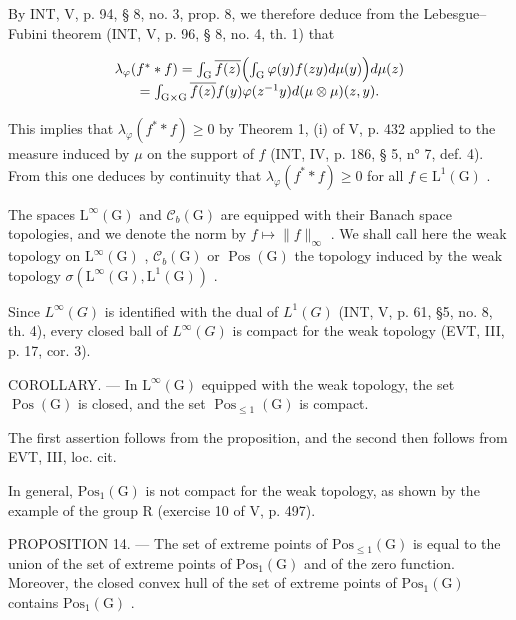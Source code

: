 By INT, V, p. 94, § 8, no. 3, prop. 8, we therefore deduce from the Lebesgue–Fubini theorem (INT, V, p. 96, § 8, no. 4, th. 1) that

\[
\begin{array}{c} \lambda_ {\varphi} (f ^ {*} * f) = \int_ {\mathrm{G}} \overline {{f (z)}} \Bigl (\int_ {\mathrm{G}} \varphi (y) f (z y) d \mu (y) \Bigr) d \mu (z) \\ = \int_ {\mathrm{G} \times \mathrm{G}} \overline {{f (z)}} f (y) \varphi (z ^ {- 1} y) d (\mu \otimes \mu) (z, y). \end{array}
\]

This implies that \(\lambda_{\varphi}(f^{*} * f) \geqslant 0\) by Theorem 1, (i) of V, p. 432 applied to the measure induced by \(\mu\) on the support of \(f\) (INT, IV, p. 186, § 5, n° 7, def. 4). From this one deduces by continuity that \(\lambda_{\varphi}(f^{*} * f) \geqslant 0\) for all \(f \in \mathrm{L}^1(\mathrm{G})\) .

The spaces \(\mathrm{L}^{\infty}(\mathrm{G})\) and \(\mathcal{C}_{b}(\mathrm{G})\) are equipped with their Banach space topologies, and we denote the norm by \(f \mapsto \|f\|_{\infty}\) . We shall call here the weak topology on \(\mathrm{L}^{\infty}(\mathrm{G})\) , \(\mathcal{C}_{b}(\mathrm{G})\) or \(\operatorname{Pos}(\mathrm{G})\) the topology induced by the weak topology \(\sigma(\mathrm{L}^{\infty}(\mathrm{G}), \mathrm{L}^{1}(\mathrm{G}))\) .

Since \(L^{\infty}(G)\) is identified with the dual of \(L^{1}(G)\) (INT, V, p. 61, §5, no. 8, th. 4), every closed ball of \(L^{\infty}(G)\) is compact for the weak topology (EVT, III, p. 17, cor. 3).

COROLLARY. --- In \(\mathrm{L}^{\infty}(\mathrm{G})\) equipped with the weak topology, the set \(\operatorname{Pos}(\mathrm{G})\) is closed, and the set \(\operatorname{Pos}_{\leqslant 1}(\mathrm{G})\) is compact.

The first assertion follows from the proposition, and the second then follows from EVT, III, loc. cit.

In general, \(\mathrm{Pos}_{1}(\mathrm{G})\) is not compact for the weak topology, as shown by the example of the group R (exercise 10 of V, p. 497).

PROPOSITION 14. --- The set of extreme points of \(\mathrm{Pos}_{\leqslant 1}(\mathrm{G})\) is equal to the union of the set of extreme points of \(\mathrm{Pos}_1(\mathrm{G})\) and of the zero function. Moreover, the closed convex hull of the set of extreme points of \(\mathrm{Pos}_1(\mathrm{G})\) contains \(\mathrm{Pos}_1(\mathrm{G})\) .

